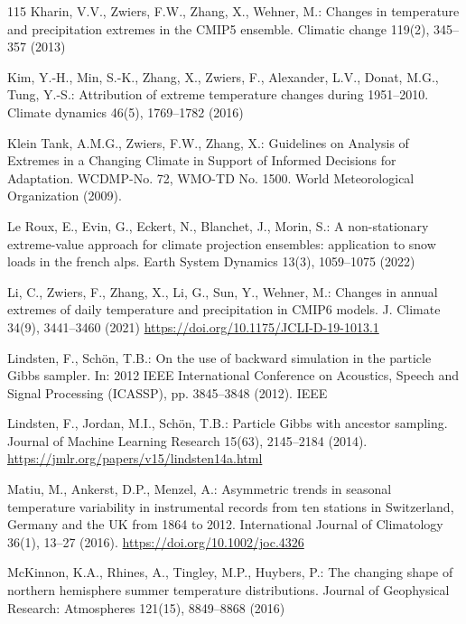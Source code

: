 \documentclass[11pt,a4paper]{article}
\begin{document}
\begin{thebibliography}{115}
		Kharin, V.V., Zwiers, F.W., Zhang, X., Wehner, M.: Changes in temperature and precipitation extremes in the CMIP5 ensemble. Climatic change 119(2), 345--357 (2013)
		
		Kim, Y.-H., Min, S.-K., Zhang, X., Zwiers, F., Alexander, L.V., Donat, M.G., Tung, Y.-S.: Attribution of extreme temperature changes during 1951--2010. Climate dynamics 46(5), 1769--1782 (2016)
		
		Klein Tank, A.M.G., Zwiers, F.W., Zhang, X.: Guidelines on Analysis of Extremes in a Changing Climate in Support of Informed Decisions for Adaptation. WCDMP-No. 72, WMO-TD No. 1500. World Meteorological Organization (2009).
		
		Le Roux, E., Evin, G., Eckert, N., Blanchet, J., Morin, S.: A non-stationary extreme-value approach for climate projection ensembles: application to snow loads in the french alps. Earth System Dynamics 13(3), 1059--1075 (2022)
		
		Li, C., Zwiers, F., Zhang, X., Li, G., Sun, Y., Wehner, M.: Changes in annual extremes of daily temperature and precipitation in CMIP6 models. J. Climate 34(9), 3441--3460 (2021) \url{https://doi.org/10.1175/JCLI-D-19-1013.1}
		
		Lindsten, F., Schön, T.B.: On the use of backward simulation in the particle Gibbs sampler. In: 2012 IEEE International Conference on Acoustics, Speech and Signal Processing (ICASSP), pp. 3845--3848 (2012). IEEE
		
		Lindsten, F., Jordan, M.I., Schön, T.B.: Particle Gibbs with ancestor sampling. Journal of Machine Learning Research 15(63), 2145--2184 (2014). \url{https://jmlr.org/papers/v15/lindsten14a.html}
		
		Matiu, M., Ankerst, D.P., Menzel, A.: Asymmetric trends in seasonal temperature variability in instrumental records from ten stations in Switzerland, Germany and the UK from 1864 to 2012. International Journal of Climatology 36(1), 13--27 (2016). \url{https://doi.org/10.1002/joc.4326}
		
		McKinnon, K.A., Rhines, A., Tingley, M.P., Huybers, P.: The changing shape of northern hemisphere summer temperature distributions. Journal of Geophysical Research: Atmospheres 121(15), 8849--8868 (2016)
		

\end{thebibliography}
\end{document}
